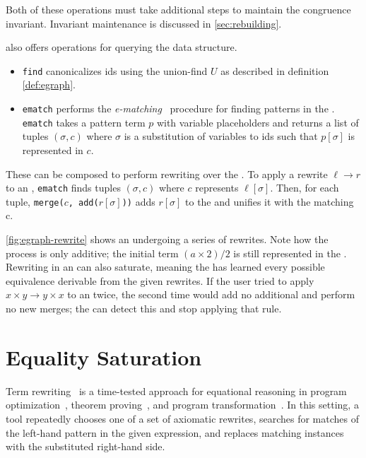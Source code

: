 Both of these operations must take additional steps to maintain the congruence
  invariant.
Invariant maintenance is discussed in \autoref{sec:rebuilding}.

\Egraphs also offers operations for querying the data structure.
\begin{itemize}
    \item \texttt{find} canonicalizes \eclass ids using the union-find $U$ as described in definition \ref{def:egraph}.
    \item \texttt{ematch} performs the
          \textit{e-matching}~\cite{simplify, ematching}
          procedure for finding patterns in the \egraph.
          \texttt{ematch} takes a pattern term $p$ with variable placeholders
          and returns a list of tuples $(\sigma, c)$ where $\sigma$ is a substitution of
          variables to \eclass ids such that $p[\sigma]$ is represented in \eclass $c$.
\end{itemize}
These can be composed to perform rewriting over the
  \egraph.
To apply a rewrite $\ell \to r$ to an \egraph,
  \texttt{ematch}
  finds tuples $(\sigma, c)$ where \eclass $c$ represents $\ell[\sigma]$.
Then, for each tuple,
  \mbox{\texttt{merge($c$, add($r[\sigma]$))}} adds $r[\sigma]$ to the \egraph
  and unifies it with the matching \eclass c.

\autoref{fig:egraph-rewrite} shows an \egraph undergoing a series of rewrites.
Note how the process is only additive; the initial term $(a \times 2) / 2$ is
  still represented in the \egraph.
Rewriting in an \egraph can also saturate, meaning the \egraph has
  learned every possible equivalence derivable from the given rewrites.
If the user tried to apply $x \times y \to y \times x$ to an \egraph twice,
  the second time would add no additional \enodes and perform no new merges;
  the \egraph can detect this and stop applying that rule.

\section{Equality Saturation}
\label{sec:eqsat}

Term rewriting~\cite{nachum-rewrites} is a time-tested approach
  for equational reasoning in
  program optimization~\cite{eqsat, denali},
  theorem proving~\cite{simplify, z3},
  and program transformation~\cite{graphs}.
In this setting, a tool repeatedly chooses one of a set of axiomatic rewrites,
  searches for matches of the left-hand pattern in the given
  expression, and replaces matching instances with the substituted
  right-hand side.


